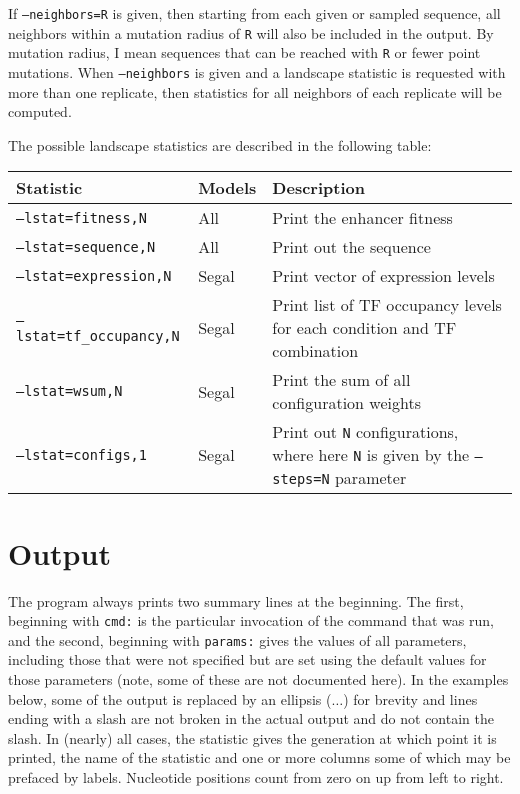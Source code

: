 \documentclass[11pt]{article}
\begin{document}
If \texttt{--neighbors=R} is given, then starting from each given or sampled sequence, all neighbors within a mutation radius of \texttt{R} will also be included in the output. By mutation radius, I mean sequences that can be reached with \texttt{R} or fewer point mutations. When \texttt{--neighbors} is given and a landscape statistic is requested with more than one replicate, then statistics for all neighbors of each replicate will be computed.

\noindent The possible landscape statistics are described in the following table:

\begin{tabular}{l|l|p{8cm}}
Statistic & Models & Description \\
\hline
\texttt{--lstat=fitness,N}          & All & Print the enhancer fitness \\
\texttt{--lstat=sequence,N}         & All & Print out the sequence \\
\texttt{--lstat=expression,N}       & Segal & Print vector of expression levels \\
\texttt{--lstat=tf\_occupancy,N}    & Segal & Print list of TF occupancy levels for each condition and TF combination \\
\texttt{--lstat=wsum,N}             & Segal & Print the sum of all configuration weights \\
\texttt{--lstat=configs,1}          & Segal & Print out \texttt{N} configurations, where here \texttt{N} is given by the \texttt{--steps=N} parameter \\
\hline
\end{tabular}

\section{Output}

The program always prints two summary lines at the beginning. The first, beginning with \texttt{cmd:} is the particular invocation of the command that was run, and the second, beginning with \texttt{params:} gives the values of all parameters, including those that were not specified but are set using the default values for those parameters (note, some of these are not documented here). In the examples below, some of the output is replaced by an ellipsis ($\ldots$) for brevity and lines ending with a slash are not broken in the actual output and do not contain the slash. In (nearly) all cases, the statistic gives the generation at which point it is printed, the name of the statistic and one or more columns some of which may be prefaced by labels. Nucleotide positions count from zero on up from left to right.
\end{document}
